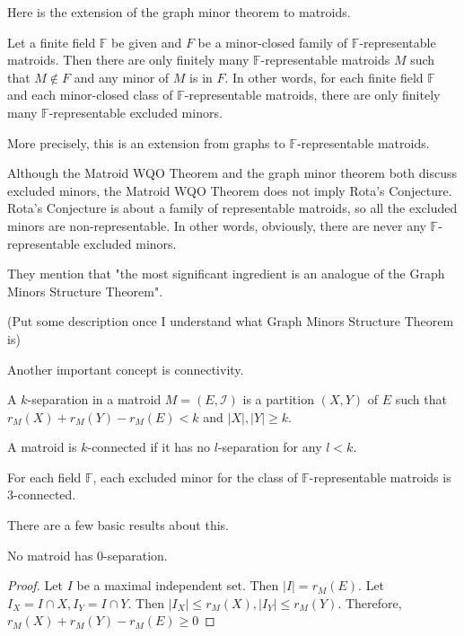 Here is the extension of the graph minor theorem to matroids.

\begin{thm} 
Let a finite field $\mathbb{F}$ be given and $F$ be a minor-closed family of $\mathbb{F}$-representable matroids.
Then there are only finitely many $\mathbb{F}$-representable matroids $M$ such that $M \notin F$ and any minor of $M$ is in $F$.
In other words, for each finite field $\mathbb{F}$ and each minor-closed class of $\mathbb{F}$-representable matroids, there are only finitely many $\mathbb{F}$-representable excluded minors.
\end{thm}

More precisely, this is an extension from graphs to $\mathbb{F}$-representable matroids.

Although the Matroid WQO Theorem and the graph minor theorem both discuss excluded minors, the Matroid WQO Theorem does not imply Rota's Conjecture.
Rota's Conjecture is about a family of representable matroids, so all the excluded minors are non-representable.
In other words, obviously, there are never any $\mathbb{F}$-representable excluded minors.

They mention that "the most significant ingredient is an analogue of the Graph Minors Structure Theorem".

(Put some description once I understand what Graph Minors Structure Theorem is)

Another important concept is connectivity.
\begin{defn}
A $k$-separation in a matroid $M = (E, \mathcal{I})$ is a partition $(X, Y)$ of $E$ such that $r_M(X) + r_M(Y) - r_M(E) < k$ and $\lvert X \rvert, \lvert Y \rvert \geq k$.
\end{defn}
\begin{defn}
A matroid is $k$-connected if it has no $l$-separation for any $l < k$.
\end{defn}

\begin{lem}
For each field $\mathbb{F}$, each excluded minor for the class of $\mathbb{F}$-representable matroids is 3-connected.
\end{lem}

There are a few basic results about this.

\begin{thm}
No matroid has 0-separation.
\end{thm}
\begin{proof}
Let $I$ be a maximal independent set.
Then $\lvert I \rvert = r_M(E)$.
Let $I_X = I \cap X, I_Y = I \cap Y$.
Then $\lvert I_X \rvert \leq r_M(X), \lvert I_Y \rvert \leq r_M(Y)$.
Therefore, $r_M(X) + r_M(Y) - r_M(E) \geq 0$
\end{proof}


